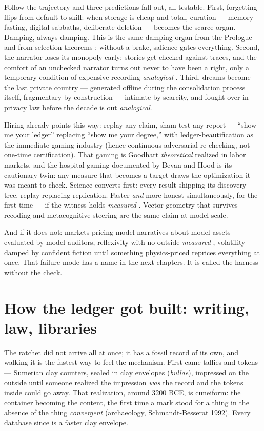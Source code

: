 Follow the trajectory and three predictions fall out, all testable. First, forgetting flips from default to skill: when storage is cheap and total, curation --- memory-fasting, digital sabbaths, deliberate deletion --- becomes the scarce organ. Damping, always damping. This is the same damping organ from the Prologue and from selection theorems \citep{nayebi2026}: without a brake, salience gates everything. Second, the narrator loses its monopoly early: stories get checked against traces, and the comfort of an unchecked narrator turns out never to have been a right, only a temporary condition of expensive recording \textit{analogical} \citep{baars1988,clark2016,seth2021}. Third, dreams become the last private country --- generated offline during the consolidation process itself, fragmentary by construction --- intimate by scarcity, and fought over in privacy law before the decade is out \textit{analogical}.

Hiring already points this way: replay any claim, sham-test any report --- ``show me your ledger'' replacing ``show me your degree,'' with ledger-beautification as the immediate gaming industry (hence continuous adversarial re-checking, not one-time certification). That gaming is Goodhart \textit{theoretical} \citep{goodhart2505,goodhart2410} realized in labor markets, and the hospital gaming documented by Bevan and Hood \citep{bevan2006} is its cautionary twin: any measure that becomes a target draws the optimization it was meant to check. Science converts first: every result shipping its discovery tree, replay replacing replication. Faster \textit{and} more honest simultaneously, for the first time --- if the witness holds \textit{measured} \citep{panickssery2024,shumailov2024}. Vector geometry that survives recoding \citep{jha2025} and metacognitive steering \citep{macar2026,cao2026} are the same claim at model scale.

And if it does not: markets pricing model-narratives about model-assets evaluated by model-auditors, reflexivity with no outside \textit{measured} \citep{soros}, volatility damped by confident fiction until something physics-priced reprices everything at once. That failure mode has a name in the next chapters. It is called the harness without the check.

\section{How the ledger got built: writing, law, libraries}

The ratchet did not arrive all at once; it has a fossil record of its own, and walking it is the fastest way to feel the mechanism. First came tallies and tokens --- Sumerian clay counters, sealed in clay envelopes (\textit{bullae}), impressed on the outside until someone realized the impression \textit{was} the record and the tokens inside could go away. That realization, around 3200 BCE, is cuneiform: the container becoming the content, the first time a mark stood for a thing in the absence of the thing \textit{convergent} (archaeology, Schmandt-Besserat 1992). Every database since is a faster clay envelope.

